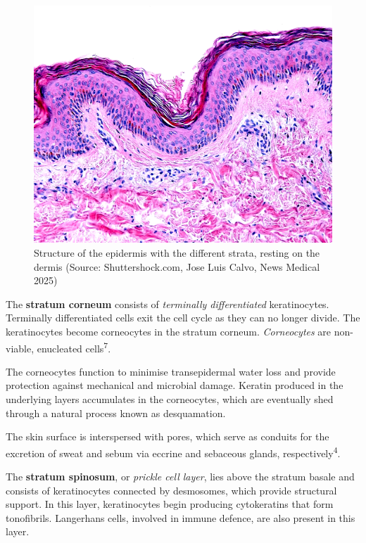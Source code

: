 \documentclass[
]{article}
\begin{document}
\begin{figure}

{\centering \includegraphics[width=0.9\linewidth]{Images/Epidermis} 

}

\caption{Structure of the epidermis with the different strata, resting on the dermis (Source: Shuttershock.com, Jose Luis Calvo, News Medical 2025)}\label{fig:unnamed-chunk-9}
\end{figure}

The \textbf{stratum corneum} consists of \emph{terminally
differentiated} keratinocytes. Terminally differentiated cells exit the
cell cycle as they can no longer divide. The keratinocytes become
corneocytes in the stratum corneum. \emph{Corneocytes} are non-viable,
enucleated cells\textsuperscript{7}.

The corneocytes function to minimise transepidermal water loss and
provide protection against mechanical and microbial damage. Keratin
produced in the underlying layers accumulates in the corneocytes, which
are eventually shed through a natural process known as desquamation.

The skin surface is interspersed with pores, which serve as conduits for
the excretion of sweat and sebum via eccrine and sebaceous glands,
respectively\textsuperscript{4}.

The \textbf{stratum spinosum}, or \emph{prickle cell layer}, lies above
the stratum basale and consists of keratinocytes connected by
desmosomes, which provide structural support. In this layer,
keratinocytes begin producing cytokeratins that form tonofibrils.
Langerhans cells, involved in immune defence, are also present in this
layer.
\end{document}

